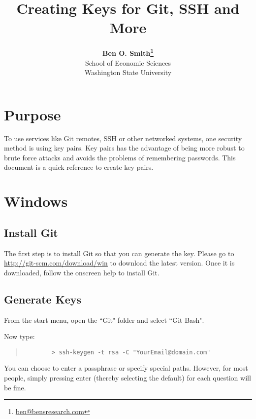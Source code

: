 \documentclass[11pt]{article}
\begin{document}
 

\title{Creating Keys for Git, SSH and More}
\date{}
\author{\textbf{Ben O. Smith\footnote{\href{mailto:ben@bensresearch.com}{ben@bensresearch.com}}} \\
School of Economic Sciences \\
Washington State University}
\maketitle \doublespace

\section*{Purpose}

To use services like Git remotes, SSH or other networked systems, one security method is using key pairs.  Key pairs has the advantage of being more robust to brute force attacks and avoids the problems of remembering passwords.  This document is a quick reference to create key pairs.

\section{Windows}

\subsection{Install Git}

The first step is to install Git so that you can generate the key.  Please go to \href{http://git-scm.com/download/win}{http://git-scm.com/download/win} to download the latest version.  Once it is downloaded, follow the onscreen help to install Git.

\subsection{Generate Keys}

From the start menu, open the ``Git" folder and select ``Git Bash".
	
Now type:

\begin{quote}
	\begin{verbatim}
		> ssh-keygen -t rsa -C "YourEmail@domain.com"
	\end{verbatim}
\end{quote}

You can choose to enter a passphrase or specify special paths.  However, for most people, simply pressing enter (thereby selecting the default) for each question will be fine.
\end{document}
